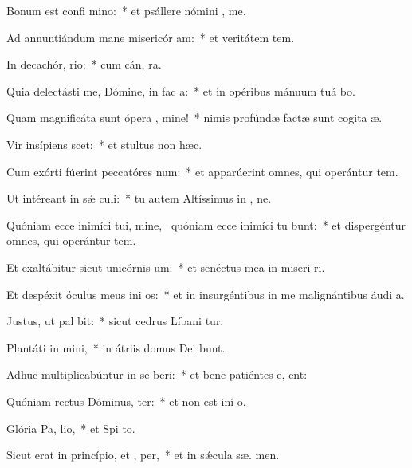 \item Bonum est confi mino:~* et psállere nómini , me.
\item Ad annuntiándum mane misericór am:~* et veritátem   tem.
\item In decachór, rio:~* cum cán,  ra.
\item Quia delectásti me, Dómine, in fac a:~* et in opéribus mánuum tuá bo.
\item Quam magnificáta sunt ópera , mine!~* nimis profúndæ factæ sunt cogita æ.
\item Vir insípiens  scet:~* et stultus non  hæc.
\item Cum exórti fúerint peccatóres  num:~* et apparúerint omnes, qui operántur tem.
\item Ut intéreant in sǽ culi:~* tu autem Altíssimus in , ne.
\item Quóniam ecce inimíci tui, mine,~\pscross{} quóniam ecce inimíci tu bunt:~* et dispergéntur omnes, qui operántur tem.
\item Et exaltábitur sicut unicórnis  um:~* et senéctus mea in miseri ri.
\item Et despéxit óculus meus ini os:~* et in insurgéntibus in me malignántibus áudi  a.
\item Justus, ut pal bit:~* sicut cedrus Líbani tur.
\item Plantáti in  mini,~* in átriis domus Dei  bunt.
\item Adhuc multiplicabúntur in se beri:~* et bene patiéntes e,  ent:
\item Quóniam rectus Dóminus,  ter:~* et non est iní  o.
\item Glória Pa,  lio,~* et Spi to.
\item Sicut erat in princípio, et ,  per,~* et in sǽcula sæ. men.
